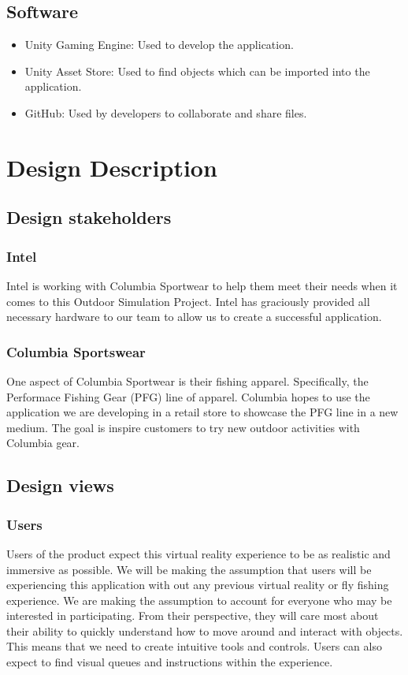 \documentclass[10pt,journal,compsoc,onecolumn, draftclsnofoot]{IEEEtran}
\begin{document}
\subsection{Software}
\begin{itemize}
  \item Unity Gaming Engine: Used to develop the application.
  \item Unity Asset Store: Used to find objects which can be imported into the application.
  \item GitHub: Used by developers to collaborate and share files.
\end{itemize}


\section{Design Description}

\subsection{Design stakeholders}
\subsubsection{Intel}
Intel is working with Columbia Sportwear to help them meet their needs when it comes to this Outdoor Simulation Project.
Intel has graciously provided all necessary hardware to our team to allow us to create a successful application.

\subsubsection{Columbia Sportswear}
One aspect of Columbia Sportwear is their fishing apparel.
Specifically, the Performace Fishing Gear (PFG) line of apparel.
Columbia hopes to use the application we are developing in a retail store to showcase the PFG line in a new medium.
The goal is inspire customers to try new outdoor activities with Columbia gear.

\subsection{Design views}
\subsubsection{Users}
Users of the product expect this virtual reality experience to be as realistic and immersive as possible. We will be making the assumption that users will be experiencing this application with out any previous virtual reality or fly fishing experience. We are making the assumption to account for everyone who may be interested in participating. From their perspective, they will care most about their ability to quickly understand how to move around and interact with objects. This means that we need to create intuitive tools and controls. Users can also expect to find visual queues and instructions within the experience.
\end{document}
